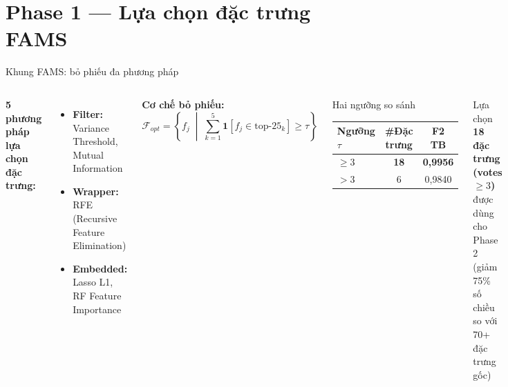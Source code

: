 \documentclass[aspectratio=169,12pt]{beamer}
\newcommand{\good}[1]{\textcolor{mygreen}{\textbf{#1}}}
\begin{document}
\section{Phase 1 --- Lựa chọn đặc trưng FAMS}

\begin{frame}{Khung FAMS: bỏ phiếu đa phương pháp}
  \begin{columns}[T]
      \textbf{5 phương pháp lựa chọn đặc trưng:}
      \vspace{0.3em}
      \begin{itemize}
        \item \textcolor{myblue}{\textbf{Filter:}} Variance Threshold, Mutual Information
        \item \textcolor{myorange}{\textbf{Wrapper:}} RFE (Recursive Feature Elimination)
        \item \textcolor{mygreen}{\textbf{Embedded:}} Lasso L1, RF Feature Importance
      \end{itemize}
      \vspace{0.6em}
      \textbf{Cơ chế bỏ phiếu:}
      \[
        \mathcal{F}_{opt} = \left\{ f_j \;\middle|\; \sum_{k=1}^{5} \mathbf{1}[f_j \in \text{top-}25_k] \geq \tau \right\}
      \]

      \begin{block}{Hai ngưỡng so sánh}
        \centering
        \begin{tabular}{lcc}
          \toprule
          Ngưỡng $\tau$ & \#Đặc trưng & F2 TB\\
          \midrule
          $\geq 3$ & \good{18} & \good{0,9956}\\
          $> 3$    & 6          & 0,9840\\
          \bottomrule
        \end{tabular}
      \end{block}
      \vspace{0.4em}
      \begin{alertblock}{Lựa chọn}
        \textbf{18 đặc trưng (votes $\geq 3$)} được dùng cho Phase 2\\
        \small(giảm 75\% số chiều so với 70+ đặc trưng gốc)
      \end{alertblock}
  \end{columns}
\end{frame}
\end{document}
